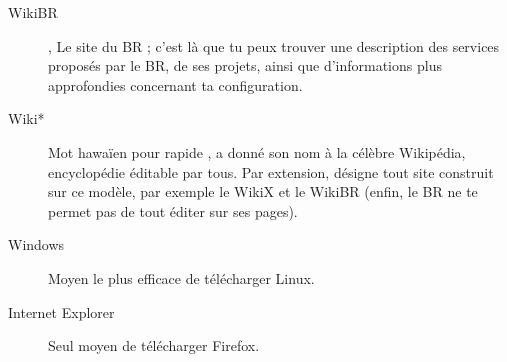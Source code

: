 \begin{description}
  \item[WikiBR] , Le site du BR ; c'est là que tu peux trouver une description des services proposés par le BR, de ses projets, ainsi que
  d'informations plus approfondies concernant ta configuration.
  
  \item[Wiki*] Mot hawa\"ien pour \og rapide \fg, a donné son nom à la célèbre Wikipédia, encyclopédie éditable par tous.
  Par extension, désigne tout site construit sur ce modèle, par exemple le WikiX et le WikiBR (enfin, le BR ne te permet pas de tout éditer sur ses pages).
  
  \item[Windows] Moyen le plus efficace de télécharger Linux.
  
  \item[Internet Explorer] Seul moyen de télécharger Firefox.
  
\end{description}
